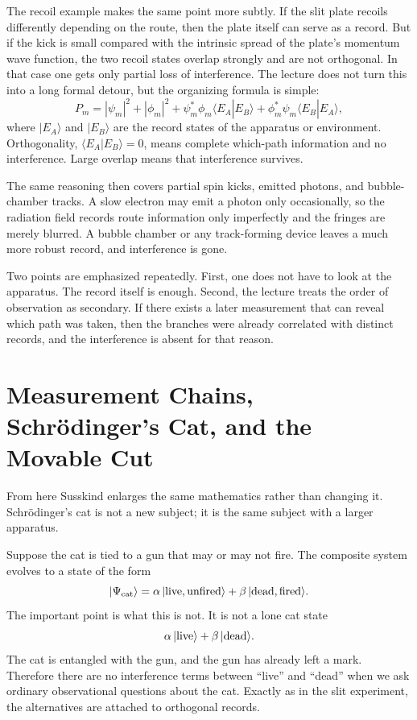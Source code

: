 The recoil example makes the same point more subtly. If the slit plate recoils differently depending on the route, then the plate itself can serve as a record. But if the kick is small compared with the intrinsic spread of the plate's momentum wave function, the two recoil states overlap strongly and are not orthogonal. In that case one gets only partial loss of interference. The lecture does not turn this into a long formal detour, but the organizing formula is simple:
\begin{equation}
P_m
=
|\psi_m|^2+|\phi_m|^2
+\psi_m^*\phi_m\langle E_A|E_B\rangle
+\phi_m^*\psi_m\langle E_B|E_A\rangle ,
\end{equation}
where \(|E_A\rangle\) and \(|E_B\rangle\) are the record states of the apparatus or environment. Orthogonality, \(\langle E_A|E_B\rangle=0\), means complete which-path information and no interference. Large overlap means that interference survives.

The same reasoning then covers partial spin kicks, emitted photons, and bubble-chamber tracks. A slow electron may emit a photon only occasionally, so the radiation field records route information only imperfectly and the fringes are merely blurred. A bubble chamber or any track-forming device leaves a much more robust record, and interference is gone.

Two points are emphasized repeatedly. First, one does not have to look at the apparatus. The record itself is enough. Second, the lecture treats the order of observation as secondary. If there exists a later measurement that can reveal which path was taken, then the branches were already correlated with distinct records, and the interference is absent for that reason.

\section{Measurement Chains, Schr\"odinger's Cat, and the Movable Cut}

From here Susskind enlarges the same mathematics rather than changing it. Schr\"odinger's cat is not a new subject; it is the same subject with a larger apparatus.

Suppose the cat is tied to a gun that may or may not fire. The composite system evolves to a state of the form
\begin{equation}
|\Psi_{\mathrm{cat}}\rangle
=
\alpha\,|{\rm live},{\rm unfired}\rangle
+
\beta\,|{\rm dead},{\rm fired}\rangle .
\end{equation}
The important point is what this is not. It is not a lone cat state
\[
\alpha\,|{\rm live}\rangle+\beta\,|{\rm dead}\rangle .
\]
The cat is entangled with the gun, and the gun has already left a mark. Therefore there are no interference terms between ``live'' and ``dead'' when we ask ordinary observational questions about the cat. Exactly as in the slit experiment, the alternatives are attached to orthogonal records.

